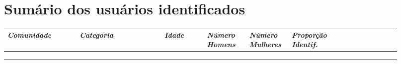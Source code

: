 
\chapter{Sumário dos usuários identificados}
\label{app:info}
\small
\begin{longtabu}{@{}
	p{0.17\linewidth}
	p{0.2\linewidth}
	P{0.1\linewidth}
	P{0.1\linewidth}
	P{0.1\linewidth}
	P{0.1\linewidth}
	p{0.15\linewidth}@{}}
\toprule
\textit{Comunidade}  & \textit{Categoria}    & \textit{Idade} & \textit{Número Homens} & \textit{Número Mulheres} & \textit{Proporção Identif.} \\ \midrule
\endhead

\\ \hline
\endfoot

\\
\endlastfoot


\end{longtabu}
